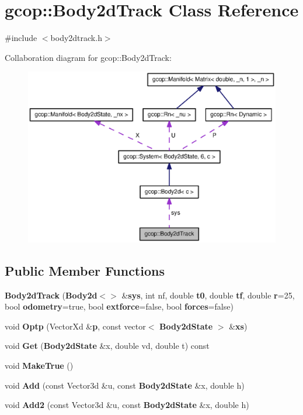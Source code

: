 \section{gcop\-:\-:\-Body2d\-Track \-Class \-Reference}
\label{classgcop_1_1Body2dTrack}


{\ttfamily \#include $<$body2dtrack.\-h$>$}



\-Collaboration diagram for gcop\-:\-:\-Body2d\-Track\-:
\nopagebreak
\begin{figure}[H]
\begin{center}
\leavevmode
\includegraphics[width=350pt]{classgcop_1_1Body2dTrack__coll__graph}
\end{center}
\end{figure}
\subsection*{\-Public \-Member \-Functions}
\begin{DoxyCompactItemize}
\item 
{\bf \-Body2d\-Track} ({\bf \-Body2d}$<$$>$ \&{\bf sys}, int nf, double {\bf t0}, double {\bf tf}, double {\bf r}=25, bool {\bf odometry}=true, bool {\bf extforce}=false, bool {\bf forces}=false)
\item 
void {\bf \-Optp} (\-Vector\-Xd \&{\bf p}, const vector$<$ {\bf \-Body2d\-State} $>$ \&{\bf xs})
\item 
void {\bf \-Get} ({\bf \-Body2d\-State} \&x, double vd, double t) const 
\item 
void {\bf \-Make\-True} ()
\item 
void {\bf \-Add} (const \-Vector3d \&u, const {\bf \-Body2d\-State} \&x, double h)
\item 
void {\bf \-Add2} (const \-Vector3d \&u, const {\bf \-Body2d\-State} \&x, double h)
\end{DoxyCompactItemize}

